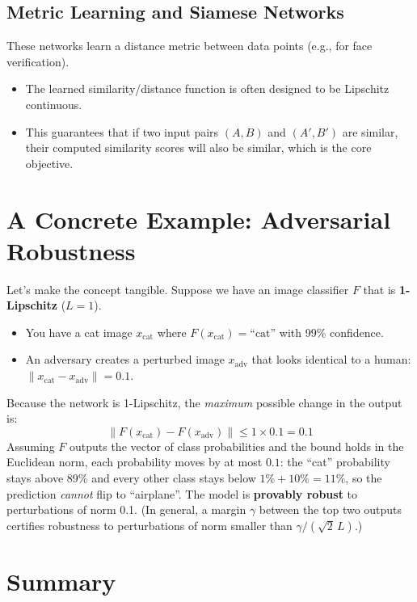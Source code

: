 \begin{notechapter}
\subsection{Metric Learning and Siamese Networks}

These networks learn a distance metric between data points (e.g., for face verification).

\begin{itemize}
    \item The learned similarity/distance function is often designed to be Lipschitz continuous.
    \item This guarantees that if two input pairs \((A, B)\) and \((A', B')\) are similar, their computed similarity scores will also be similar, which is the core objective.
\end{itemize}

\section{A Concrete Example: Adversarial Robustness}

Let's make the concept tangible. Suppose we have an image classifier \( F \) that is \textbf{1-Lipschitz} (\(L=1\)).

\begin{itemize}
    \item You have a cat image \( x_{\text{cat}} \) where \( F(x_{\text{cat}}) = \text{``cat''} \) with 99\% confidence.
    \item An adversary creates a perturbed image \( x_{\text{adv}} \) that looks identical to a human: \( \|x_{\text{cat}} - x_{\text{adv}}\| = 0.1 \).
\end{itemize}

Because the network is 1-Lipschitz, the \textit{maximum} possible change in the output is:
\[
\|F(x_{\text{cat}}) - F(x_{\text{adv}})\| \leq 1 \times 0.1 = 0.1
\]
Assuming \( F \) outputs the vector of class probabilities and the bound holds in the Euclidean norm, each probability moves by at most \( 0.1 \): the ``cat'' probability stays above 89\% and every other class stays below \( 1\% + 10\% = 11\% \), so the prediction \emph{cannot} flip to ``airplane''. The model is \textbf{provably robust} to perturbations of norm 0.1. (In general, a margin \( \gamma \) between the top two outputs certifies robustness to perturbations of norm smaller than \( \gamma / (\sqrt{2}\,L) \).)

\section{Summary}


\end{notechapter}
